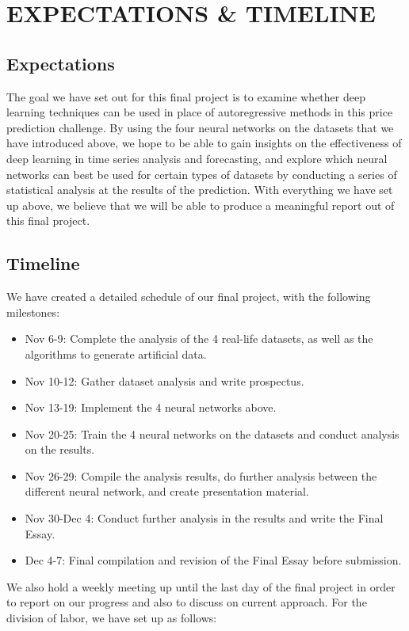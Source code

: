 \documentclass[letterpaper, 10 pt, conference]{ieeeconf}  %
\begin{document}
\section{EXPECTATIONS \& TIMELINE}

    \subsection{Expectations}
    The goal we have set out for this final project is to examine whether deep learning techniques can be used in place of autoregressive methods in this price prediction challenge. By using the four neural networks on the datasets that we have introduced above, we hope to be able to gain insights on the effectiveness of deep learning in time series analysis and forecasting, and explore which neural networks can best be used for certain types of datasets by conducting a series of statistical analysis at the results of the prediction. With everything we have set up above, we believe that we will be able to produce a meaningful report out of this final project.

    \subsection{Timeline}
    We have created a detailed schedule of our final project, with the following milestones:
    \begin{itemize}
        \item Nov 6-9: Complete the analysis of the 4 real-life datasets, as well as the algorithms to generate artificial data.
        \item Nov 10-12: Gather dataset analysis and write prospectus.
        \item Nov 13-19: Implement the 4 neural networks above.
        \item Nov 20-25: Train the 4 neural networks on the datasets and conduct analysis on the results.
        \item Nov 26-29: Compile the analysis results, do further analysis between the different neural network, and create presentation material.
        \item Nov 30-Dec 4: Conduct further analysis in the results and write the Final Essay.
        \item Dec 4-7: Final compilation and revision of the Final Essay before submission. 
    \end{itemize}

    We also hold a weekly meeting up until the last day of the final project in order to report on our progress and also to discuss on current approach. For the division of labor, we have set up as follows:
\end{document}
